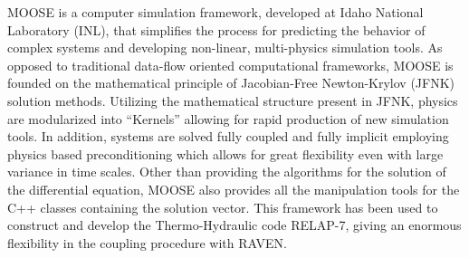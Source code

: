 \documentclass{mc2013}
\begin{document}
\label{sec:MOOSE/RELAP-7}
MOOSE is a computer simulation framework,  developed at Idaho National Laboratory (INL), that simplifies the process for predicting the behavior of complex systems and developing non-linear, multi-physics simulation tools. As opposed to traditional data-flow oriented computational frameworks, MOOSE is founded on the mathematical principle of Jacobian-Free Newton-Krylov (JFNK) solution methods. Utilizing the mathematical structure present in JFNK, physics are modularized into “Kernels” allowing for rapid production of new simulation tools. In addition, systems are solved fully coupled and fully implicit employing physics based preconditioning which allows for great flexibility even with large variance in time scales. Other than providing the algorithms for the solution of the differential equation, MOOSE also provides all the manipulation tools for the C++ classes containing the solution vector. This framework has been used to construct and develop the Thermo-Hydraulic code RELAP-7, giving an enormous flexibility in the coupling procedure with RAVEN.
\end{document}
